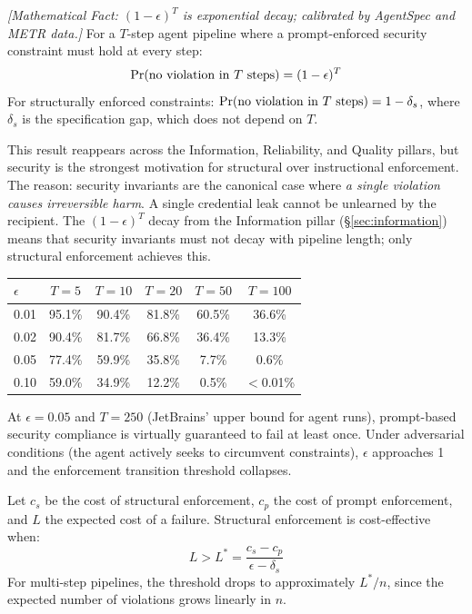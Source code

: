 \begin{theorem}
\emph{[Mathematical Fact: $(1-\epsilon)^T$ is exponential decay; calibrated by AgentSpec and METR data.]}
\label{thm:sec-decay}
For a $T$-step agent pipeline where a prompt-enforced security constraint must hold at every step:
\begin{equation}
\Pr(\textup{no violation in } T \textup{ steps}) = (1-\epsilon)^T
\end{equation}
For structurally enforced constraints: $\Pr(\textup{no violation in } T \textup{ steps}) = 1 - \delta_s$, where $\delta_s$ is the specification gap, which does not depend on $T$.
\end{theorem}

This result reappears across the Information, Reliability, and Quality pillars, but security is the strongest motivation for structural over instructional enforcement. The reason: security invariants are the canonical case where \emph{a single violation causes irreversible harm}. A single credential leak cannot be unlearned by the recipient. The $(1-\epsilon)^T$ decay from the Information pillar (\S\ref{sec:information}) means that security invariants must not decay with pipeline length; only structural enforcement achieves this.

\begin{center}
\small
\begin{tabular}{lccccc}
\toprule
$\epsilon$ & $T=5$ & $T=10$ & $T=20$ & $T=50$ & $T=100$ \\
\midrule
0.01 & 95.1\% & 90.4\% & 81.8\% & 60.5\% & 36.6\% \\
0.02 & 90.4\% & 81.7\% & 66.8\% & 36.4\% & 13.3\% \\
0.05 & 77.4\% & 59.9\% & 35.8\% & 7.7\% & 0.6\% \\
0.10 & 59.0\% & 34.9\% & 12.2\% & 0.5\% & $<$0.01\% \\
\bottomrule
\end{tabular}
\end{center}

At $\epsilon = 0.05$ and $T = 250$ (JetBrains' upper bound for agent runs), prompt-based security compliance is virtually guaranteed to fail at least once. Under adversarial conditions (the agent actively seeks to circumvent constraints), $\epsilon$ approaches 1 and the enforcement transition threshold collapses.

\begin{theorem}
\label{thm:sec-threshold}
Let $c_s$ be the cost of structural enforcement, $c_p$ the cost of prompt enforcement, and $L$ the expected cost of a failure. Structural enforcement is cost-effective when:
\begin{equation}
L > L^* = \frac{c_s - c_p}{\epsilon - \delta_s}
\end{equation}
For multi-step pipelines, the threshold drops to approximately $L^*/n$, since the expected number of violations grows linearly in $n$.
\end{theorem}

